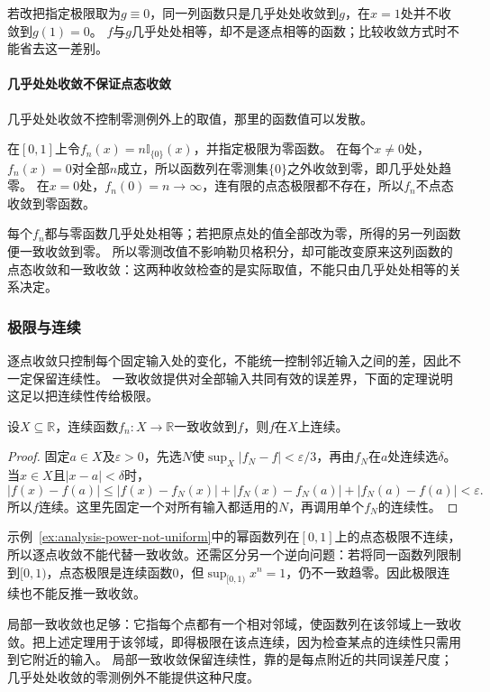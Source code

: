 若改把指定极限取为$g\equiv0$，同一列函数只是几乎处处收敛到$g$，在$x=1$处并不收敛到$g(1)=0$。
$f$与$g$几乎处处相等，却不是逐点相等的函数；比较收敛方式时不能省去这一差别。

\paragraph{几乎处处收敛不保证点态收敛}
几乎处处收敛不控制零测例外上的取值，那里的函数值可以发散。
\begin{example}[原点处发散而几乎处处趋零的函数列]
\label{ex:analysis-ae-not-pointwise}
在$[0,1]$上令$f_n(x)=n\mathbb I_{\{0\}}(x)$，并指定极限为零函数。
在每个$x\neq0$处，$f_n(x)=0$对全部$n$成立，所以函数列在零测集$\{0\}$之外收敛到零，即几乎处处趋零。
在$x=0$处，$f_n(0)=n\to\infty$，连有限的点态极限都不存在，所以$f_n$不点态收敛到零函数。
\end{example}
每个$f_n$都与零函数几乎处处相等；若把原点处的值全部改为零，所得的另一列函数便一致收敛到零。
所以零测改值不影响勒贝格积分，却可能改变原来这列函数的点态收敛和一致收敛：这两种收敛检查的是实际取值，不能只由几乎处处相等的关系决定。

\subsubsection{极限与连续}

逐点收敛只控制每个固定输入处的变化，不能统一控制邻近输入之间的差，因此不一定保留连续性。
一致收敛提供对全部输入共同有效的误差界，下面的定理说明这足以把连续性传给极限。
\begin{theorem}[一致极限保持连续性]
\label{thm:analysis-uniform-continuity-limit}
设$X\subseteq\mathbb R$，连续函数$f_n:X\to\mathbb R$一致收敛到$f$，则$f$在$X$上连续。
\end{theorem}
\begin{proof}
固定$a\in X$及$\varepsilon>0$，先选$N$使$\sup_X|f_N-f|<\varepsilon/3$，再由$f_N$在$a$处连续选$\delta$。当$x\in X$且$|x-a|<\delta$时，
\[
 |f(x)-f(a)|
 \leq |f(x)-f_N(x)|+|f_N(x)-f_N(a)|+|f_N(a)-f(a)|<\varepsilon.
\]
所以$f$连续。这里先固定一个对所有输入都适用的$N$，再调用单个$f_N$的连续性。
\end{proof}

示例~\ref{ex:analysis-power-not-uniform}中的幂函数列在$[0,1]$上的点态极限不连续，所以逐点收敛不能代替一致收敛。还需区分另一个逆向问题：若将同一函数列限制到$[0,1)$，点态极限是连续函数$0$，但$\sup_{[0,1)}x^n=1$，仍不一致趋零。因此极限连续也不能反推一致收敛。

局部一致收敛也足够：它指每个点都有一个相对邻域，使函数列在该邻域上一致收敛。把上述定理用于该邻域，即得极限在该点连续，因为检查某点的连续性只需用到它附近的输入。
局部一致收敛保留连续性，靠的是每点附近的共同误差尺度；几乎处处收敛的零测例外不能提供这种尺度。

